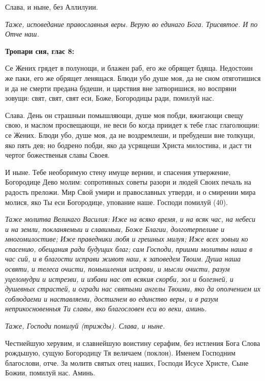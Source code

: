 Слава, и ныне, без Аллилуии. 

\itshape Таже, исповедание православныя веры.\normalfont{} Верую во единаго Бога. Трисвятое. И по Отче наш. 


\medskip


\bfseries Тропари сия, глас 8:\normalfont{}\nopagebreak


Се Жених грядет в полунощи, и блажен раб, его же обрящет бдяща. Недостоин же паки, его же обрящет ленящася. Блюди убо душе моя, да не сном отяготишися и да не смерти предана будеши, и царствия вне затворишися, но воспряни зовущи: свят, свят, свят еси, Боже, Богородицы ради, помилуй нас. 

Слава. День он страшныи помышляющи, душе моя побди, вжигающи свещу свою, и маслом просвещающи, не веси бо когда приидет к тебе глас глаголющии: се Жених. Блюди убо, душе моя, да не воздремлеши, и пребудеши вне толкущи, яко пять дев; но бодрено побди, яко да усрящеши Христа милостива, и даст ти чертог божественыя славы Своея. 

И ныне. Тебе необоримую стену имуще вернии, и спасения утвержение, Богородице Дево молим: сопротивных советы разори и людей Своих печаль на радость преложи. Мир Свой умири и православных утверди, и о смирении мира молися, яко Ты еси Богородице, упование наше. Господи помилуй (40). 


\medskip


\itshape Таже молитва Великаго Василия:\normalfont{} Иже на всяко время, и на всяк час, на небеси и на земли, покланяемыи и славимыи, Боже Благии, долготерпеливе и многомилостиве; Иже праведники любя и грешных милуя; Иже всех зовыи ко спасению, обещания ради будущих благ; сам Господи, приими молитвы наша в час сий, и в благости исправи живот наш, к заповедем Твоим. Душа наша освяти, и телеса очисти, помышления исправи, и мысли очисти, разум уцеломудри и истрезви, и избави нас от всякия скорби, зол и болезней, и душевных страстей, и огради нас святыми ангелы Твоими, яко да ополчением их соблюдаеми и наставляеми, достигнем во единство веры, и в разум неприкосновенныя Ти славы, яко благословен еси во веки, аминь. 

\itshape Таже, Господи помилуй\normalfont{} (трижды). Слава, и ныне. 

Честнейшую херувим, и славнейшую воистину серафим, без истления Бога Слова рождьшую, сущую Богородицу Тя величаем (поклон). Именем Господним благослови, отче. За молитв святых отец наших, Господи Исусе Христе, Сыне Божии, помилуй нас. Аминь. 


